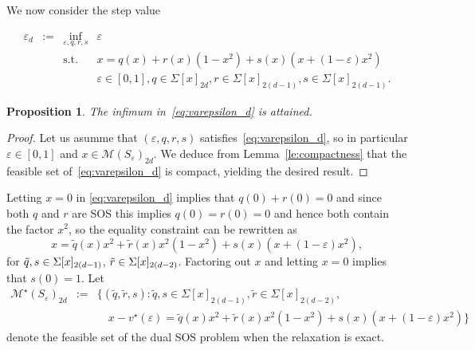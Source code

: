 \documentclass[a4paper,12pt]{article}
\newcommand{\cM}{\mathcal{M}} %
\newtheorem{proposition}{Proposition}
\newcommand{\revise}[1]{{\color{black}#1}}
\newcommand{\didier}[1]{{\color{red} #1}}
\newcommand{\adrien}[1]{{\color{magenta} #1}}
\begin{document}
We now consider the step value

\begin{equation}
\label{eq:varepsilon_d}
\begin{array}{rcrl}
\varepsilon_d & := & \inf_{\varepsilon,q,r,s} & \varepsilon \\  
& &  \mathrm{s.t.} & x = q(x) + r(x) (1-x^2) + s(x) (x+(1-\varepsilon)x^2) \\
& & & \varepsilon \in [0,1], q \in \Sigma[x]_{2d}, r \in \Sigma[x]_{2(d-1)}, s \in \Sigma[x]_{2(d-1)}.
\end{array}
\end{equation}
%
{
\begin{proposition}
\label{th:varepsilon_d}
The infimum in~\eqref{eq:varepsilon_d} is attained.
\end{proposition}
%
\begin{proof}
Let us asumme that $(\varepsilon, q,r,s)$ satisfies~\eqref{eq:varepsilon_d}, so in particular $\varepsilon \in [0,1]$ and $x \in \cM(S_{\varepsilon})_{2 d}$. 
We deduce from Lemma~\ref{le:compactness} that the feasible set of~\eqref{eq:varepsilon_d} is compact, yielding the desired result. 
\end{proof}
}



Letting $x=0$ in \eqref{eq:varepsilon_d} implies that $q(0)+r(0)=0$ and since both $q$ and $r$ are SOS this implies $q(0)=r(0)=0$ and hence both contain the factor $x^2$, so the equality constraint can be rewritten as
\begin{equation}\label{sosred}
x = {\tilde{q}}(x) x^2 + {\tilde{r}}(x)x^2(1-x^2)+s(x)(x+(1-\varepsilon)x^2) ,
\end{equation}
for ${\tilde{q},\revise{s}} \in \Sigma[x]_{2 (d-1)}$, $\revise{\tilde{r}} \in  \Sigma[x]_{2 (d-2)}$.
Factoring out $x$ and letting $x=0$ implies that $s(0)=1$.
Let
\[
\begin{array}{rcl}
{\cM^{\star}(S_{\varepsilon})_{2 d}}& :=& \{{(\tilde{q}, \tilde{r}, s )} : 
\tilde{q},s \in \Sigma[x]_{2(d-1)}, 
{\tilde{r}} \in \Sigma[x]_{2(d-2)}, \\
& &
\quad x - v^\star(\varepsilon)=  {\tilde{q}}(x) x^2 + {\tilde{r}}(x)x^2(1-x^2)+s(x)(x+(1-\varepsilon)x^2) \}
\end{array}
\]
denote the feasible set of the dual SOS problem when the relaxation is exact. 
\end{document}
